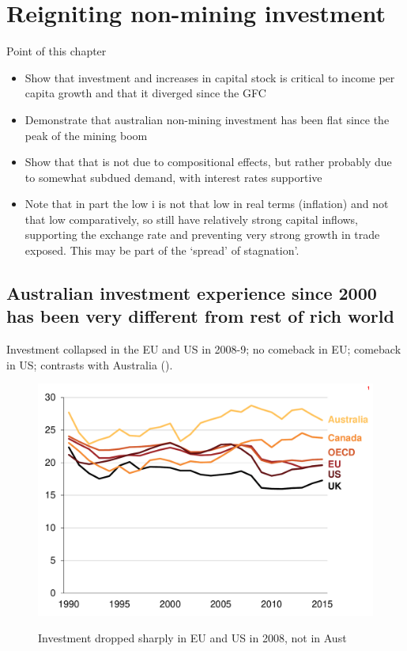 \chapter{Reigniting non-mining investment} \label{chap2}

Point of this chapter

\begin{itemize}
    \item Show that investment and increases in capital stock is critical to income per capita growth and that it diverged since the GFC
    \item Demonstrate that australian non-mining investment has been flat since the peak of the mining boom
    \item Show that that is not due to compositional effects, but rather probably due to somewhat subdued demand, with interest rates supportive
    \item Note that in part the low i is not that low in real terms (inflation) and not that low comparatively, so still have relatively strong capital inflows, supporting the exchange rate and preventing very strong growth in trade exposed. This may be part of the `spread' of stagnation'.   
\end{itemize} 

\section{Australian investment experience since 2000 has been very different from rest of rich world}

Investment collapsed in the EU and US in 2008-9; no comeback in EU; comeback in US; contrasts with Australia ().

\begin{figure}[p] 
 \caption{Investment dropped sharply in EU and US in 2008, not in Aust}
 \includegraphics[page=1]{atlas/Ch2.pdf}\label{fig:inv}

\end{figure}

